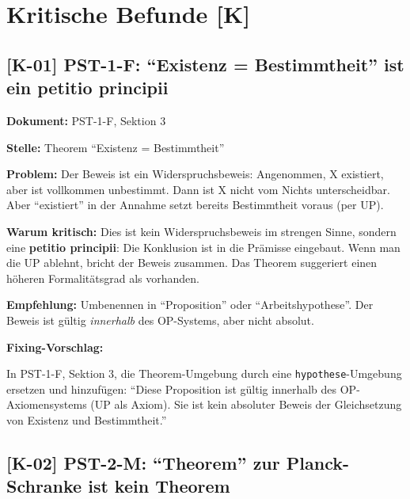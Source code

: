 \documentclass[11pt,a4paper]{article}
\newcommand{\K}[1]{\textbf{[K-#1]}}
\newcommand{\Dok}[1]{\noindent\textbf{Dokument:} #1\par\smallskip}
\newcommand{\Stelle}[1]{\noindent\textbf{Stelle:} #1\par\smallskip}
\newcommand{\Prob}[1]{\noindent\textbf{Problem:} #1\par\smallskip}
\newcommand{\Krit}[1]{\noindent\textbf{Warum kritisch:} #1\par\smallskip}
\newcommand{\Empf}[1]{\noindent\textbf{Empfehlung:} #1\par\smallskip}
\newenvironment{Fix}
  {\par\medskip\noindent\textbf{Fixing-Vorschlag:}\par\nobreak\smallskip}
  {\par\medskip}
\begin{document}
\newpage

\section{Kritische Befunde [K]}

\subsection{\K{01} PST-1-F: ``Existenz = Bestimmtheit'' ist ein petitio principii}

\Dok{PST-1-F, Sektion 3}
\Stelle{Theorem ``Existenz = Bestimmtheit''}
\Prob{Der Beweis ist ein Widerspruchsbeweis: Angenommen, X existiert,
aber ist vollkommen unbestimmt. Dann ist X nicht vom Nichts
unterscheidbar. Aber ``existiert'' in der Annahme setzt bereits
Bestimmtheit voraus (per UP).}
\Krit{Dies ist kein Widerspruchsbeweis im strengen Sinne, sondern eine
\textbf{petitio principii}: Die Konklusion ist in die Prämisse
eingebaut. Wenn man die UP ablehnt, bricht der Beweis zusammen. Das
Theorem suggeriert einen höheren Formalitätsgrad als
vorhanden.}
\Empf{Umbenennen in ``Proposition'' oder ``Arbeitshypothese''. Der
Beweis ist gültig \emph{innerhalb} des OP-Systems, aber nicht
absolut.}
\begin{Fix}
In PST-1-F, Sektion 3, die Theorem-Umgebung durch eine
\texttt{hypothese}-Umgebung ersetzen und hinzufügen: ``Diese
Proposition ist gültig innerhalb des OP-Axiomensystems (UP als
Axiom). Sie ist kein absoluter Beweis der Gleichsetzung von Existenz
und Bestimmtheit.''
\end{Fix}

\subsection{\K{02} PST-2-M: ``Theorem'' zur Planck-Schranke ist kein Theorem}
\end{document}
